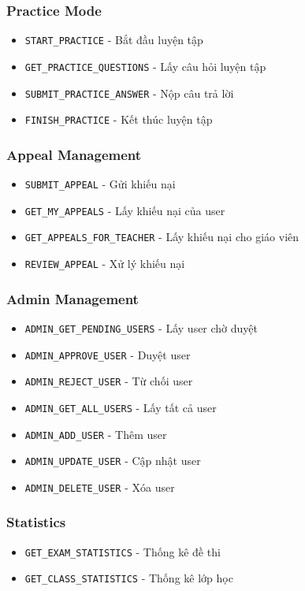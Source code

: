 ﻿\documentclass[12pt,a4paper]{report}
\begin{document}
\subsubsection{Practice Mode}
\begin{itemize}
    \item \texttt{START\_PRACTICE} - Bắt đầu luyện tập
    \item \texttt{GET\_PRACTICE\_QUESTIONS} - Lấy câu hỏi luyện tập
    \item \texttt{SUBMIT\_PRACTICE\_ANSWER} - Nộp câu trả lời
    \item \texttt{FINISH\_PRACTICE} - Kết thúc luyện tập
\end{itemize}

\subsubsection{Appeal Management}
\begin{itemize}
    \item \texttt{SUBMIT\_APPEAL} - Gửi khiếu nại
    \item \texttt{GET\_MY\_APPEALS} - Lấy khiếu nại của user
    \item \texttt{GET\_APPEALS\_FOR\_TEACHER} - Lấy khiếu nại cho giáo viên
    \item \texttt{REVIEW\_APPEAL} - Xử lý khiếu nại
\end{itemize}

\subsubsection{Admin Management}
\begin{itemize}
    \item \texttt{ADMIN\_GET\_PENDING\_USERS} - Lấy user chờ duyệt
    \item \texttt{ADMIN\_APPROVE\_USER} - Duyệt user
    \item \texttt{ADMIN\_REJECT\_USER} - Từ chối user
    \item \texttt{ADMIN\_GET\_ALL\_USERS} - Lấy tất cả user
    \item \texttt{ADMIN\_ADD\_USER} - Thêm user
    \item \texttt{ADMIN\_UPDATE\_USER} - Cập nhật user
    \item \texttt{ADMIN\_DELETE\_USER} - Xóa user
\end{itemize}

\subsubsection{Statistics}
\begin{itemize}
    \item \texttt{GET\_EXAM\_STATISTICS} - Thống kê đề thi
    \item \texttt{GET\_CLASS\_STATISTICS} - Thống kê lớp học
\end{itemize}
\end{document}
